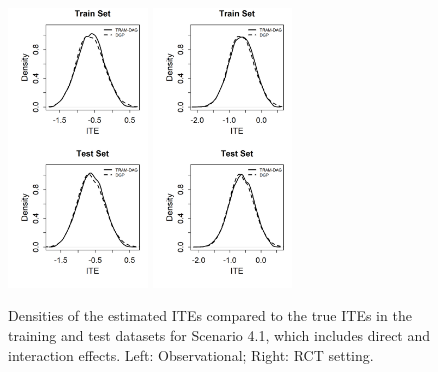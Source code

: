 \begin{figure}[htbp]
\centering
\includegraphics[width=0.33\textwidth]{img/results/observ_scenario1_ITE_densities_train_test.png} 
\includegraphics[width=0.33\textwidth]{img/results/rct_scenario1_ITE_densities_train_test.png}
\vspace{-17pt}
\caption{Densities of the estimated ITEs compared to the true ITEs in the training and test datasets for Scenario 4.1, which includes direct and interaction effects. Left: Observational; Right: RCT setting.}
\label{fig:scenario1_ite_densities_train_test}
\end{figure}






